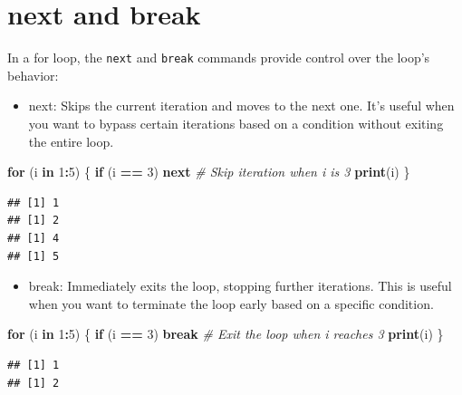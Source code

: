 \documentclass[
]{book}
\newenvironment{Shaded}{\begin{snugshade}}{\end{snugshade}}
\newcommand{\CommentTok}[1]{\textcolor[rgb]{0.56,0.35,0.01}{\textit{#1}}}
\newcommand{\ControlFlowTok}[1]{\textcolor[rgb]{0.13,0.29,0.53}{\textbf{#1}}}
\newcommand{\DecValTok}[1]{\textcolor[rgb]{0.00,0.00,0.81}{#1}}
\newcommand{\FunctionTok}[1]{\textcolor[rgb]{0.13,0.29,0.53}{\textbf{#1}}}
\newcommand{\NormalTok}[1]{#1}
\newcommand{\SpecialCharTok}[1]{\textcolor[rgb]{0.81,0.36,0.00}{\textbf{#1}}}
\providecommand{\tightlist}{%
  \setlength{\itemsep}{0pt}\setlength{\parskip}{0pt}}
\begin{document}
\section{next and break}\label{next-and-break}

In a for loop, the \texttt{next} and \texttt{break} commands provide control over the loop's behavior:

\begin{itemize}
\tightlist
\item
  next: Skips the current iteration and moves to the next one. It's useful when you want to bypass certain iterations based on a condition without exiting the entire loop.
\end{itemize}

\begin{Shaded}
\begin{Highlighting}[]
\ControlFlowTok{for}\NormalTok{ (i }\ControlFlowTok{in} \DecValTok{1}\SpecialCharTok{:}\DecValTok{5}\NormalTok{) \{}
  \ControlFlowTok{if}\NormalTok{ (i }\SpecialCharTok{==} \DecValTok{3}\NormalTok{) }\ControlFlowTok{next}  \CommentTok{\# Skip iteration when i is 3}
  \FunctionTok{print}\NormalTok{(i)}
\NormalTok{\}}
\end{Highlighting}
\end{Shaded}

\begin{verbatim}
## [1] 1
## [1] 2
## [1] 4
## [1] 5
\end{verbatim}

\begin{itemize}
\tightlist
\item
  break: Immediately exits the loop, stopping further iterations. This is useful when you want to terminate the loop early based on a specific condition.
\end{itemize}

\begin{Shaded}
\begin{Highlighting}[]
\ControlFlowTok{for}\NormalTok{ (i }\ControlFlowTok{in} \DecValTok{1}\SpecialCharTok{:}\DecValTok{5}\NormalTok{) \{}
  \ControlFlowTok{if}\NormalTok{ (i }\SpecialCharTok{==} \DecValTok{3}\NormalTok{) }\ControlFlowTok{break}  \CommentTok{\# Exit the loop when i reaches 3}
  \FunctionTok{print}\NormalTok{(i)}
\NormalTok{\}}
\end{Highlighting}
\end{Shaded}

\begin{verbatim}
## [1] 1
## [1] 2
\end{verbatim}
\end{document}
